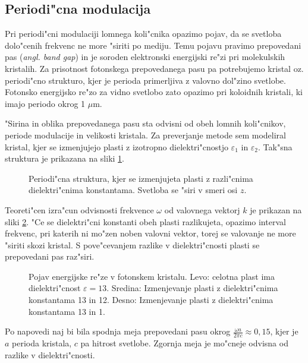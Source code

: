 \documentclass[a4paper,10pt]{article}
\newcommand{\angl}[1]{(\textit{angl. #1})}
\begin{document}
\subsection{Periodi"cna modulacija}

Pri periodi"cni modulaciji lomnega koli"cnika opazimo pojav, da se svetloba dolo"cenih frekvenc ne more "siriti po mediju\cite{joannopoulos}. 
Temu pojavu pravimo prepovedani pas \angl{band gap} in je soroden elektronski energijski re"zi pri molekulskih kristalih. 
Za prisotnost fotonskega prepovedanega pasu pa potrebujemo kristal oz. periodi"cno strukturo, kjer je perioda primerljiva z valovno dol"zino svetlobe. 
Fotonsko energijsko re"zo za vidno svetlobo zato opazimo pri koloidnih kristali, ki imajo periodo okrog 1 $\mu$m. 


"Sirina in oblika prepovedanega pasu sta odvisni od obeh lomnih koli"cnikov, periode modulacije in velikosti kristala. 
Za preverjanje metode sem modeliral kristal, kjer se izmenjujejo plasti z izotropno dielektri"cnostjo $\varepsilon_1$ in $\varepsilon_2$. 
Tak"sna struktura je prikazana na sliki \ref{fig:periodic-structure}. 

\begin{figure}[h]
 \centering
 
 \caption{Periodi"cna struktura, kjer se izmenjujeta plasti z razli"cnima dielektri"cnima konstantama. 
 Svetloba se "siri v smeri osi $z$\cite{joannopoulos}. }
 \label{fig:periodic-structure}
\end{figure}

Teoreti"cen izra"cun odvisnosti frekvence $\omega$ od valovnega vektorj $k$ je prikazan na sliki \ref{fig:joannopoulos-crystal}. 
"Ce se dielektri"cni konstanti obeh plasti razlikujeta, opazimo interval frekvenc, pri katerih ni mo"zen noben valovni vektor, torej se valovanje ne more "siriti skozi kristal. 
S pove"cevanjem razlike v dielektri"cnosti plasti se prepovedani pas raz"siri. 

\begin{figure}[h]
\centering
  
 \caption{Pojav energijske re"ze v fotonskem kristalu. Levo: celotna plast ima dielektri"cnost $\varepsilon = 13$. Sredina: Izmenjevanje plasti z dielektri"cnima konstantama 13 in 12. Desno: Izmenjevanje plasti z dielektri"cnima konstantama 13 in 1. \cite{joannopoulos}}
 \label{fig:joannopoulos-crystal}
\end{figure}

Po napovedi naj bi bila spodnja meja prepovedani pasu okrog $\frac{\omega a}{2\pi c} \approx 0,\!15$, kjer je $a$ perioda kristala, $c$ pa hitrost svetlobe. 
Zgornja meja je mo"cneje odvisna od razlike v dielektri"cnosti\cite{joannopoulos}. 
\end{document}
